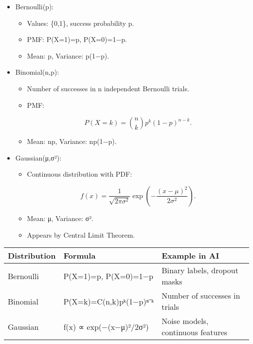 \documentclass[
  letterpaper,
  DIV=11,
  numbers=noendperiod]{scrreprt}
\providecommand{\tightlist}{%
  \setlength{\itemsep}{0pt}\setlength{\parskip}{0pt}}
\begin{document}
\begin{itemize}
\item
  Bernoulli(p):

  \begin{itemize}
  \tightlist
  \item
    Values: \{0,1\}, success probability p.
  \item
    PMF: P(X=1)=p, P(X=0)=1−p.
  \item
    Mean: p, Variance: p(1−p).
  \end{itemize}
\item
  Binomial(n,p):

  \begin{itemize}
  \item
    Number of successes in n independent Bernoulli trials.
  \item
    PMF:

    \[
    P(X=k) = \binom{n}{k} p^k (1-p)^{n-k}.
    \]
  \item
    Mean: np, Variance: np(1−p).
  \end{itemize}
\item
  Gaussian(μ,σ²):

  \begin{itemize}
  \item
    Continuous distribution with PDF:

    \[
    f(x) = \frac{1}{\sqrt{2\pi\sigma^2}} \exp\left(-\frac{(x-\mu)^2}{2\sigma^2}\right).
    \]
  \item
    Mean: μ, Variance: σ².
  \item
    Appears by Central Limit Theorem.
  \end{itemize}
\end{itemize}

\begin{longtable}[]{@{}
  >{\raggedright\arraybackslash}p{}
  >{\raggedright\arraybackslash}p{}
  >{\raggedright\arraybackslash}p{}@{}}
\toprule\noalign{}
\begin{minipage}[b]{\linewidth}\raggedright
Distribution
\end{minipage} & \begin{minipage}[b]{\linewidth}\raggedright
Formula
\end{minipage} & \begin{minipage}[b]{\linewidth}\raggedright
Example in AI
\end{minipage} \\
\midrule\noalign{}
\endhead
\bottomrule\noalign{}
\endlastfoot
Bernoulli & P(X=1)=p, P(X=0)=1−p & Binary labels, dropout masks \\
Binomial & P(X=k)=C(n,k)pᵏ(1−p)ⁿ⁻ᵏ & Number of successes in trials \\
Gaussian & f(x) ∝ exp(−(x−μ)²/2σ²) & Noise models, continuous
features \\
\end{longtable}
\end{document}
